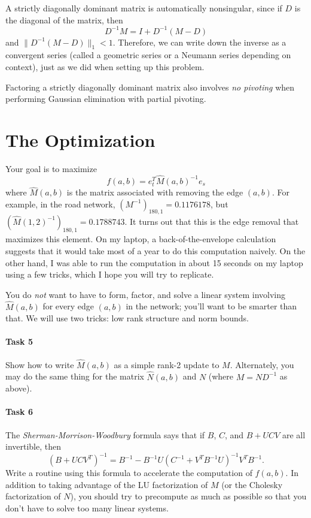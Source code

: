 \documentclass[12pt, leqno]{article}
\begin{document}
A strictly diagonally dominant matrix is automatically nonsingular,
since if $D$ is the diagonal of the matrix, then
\[
  D^{-1} M = I + D^{-1} (M-D)
\]
and $\|D^{-1} (M-D)\|_1 < 1$.  Therefore, we can write down the
inverse as a convergent series (called a geometric series or a Neumann
series depending on context), just as we did when setting up this
problem.

Factoring a strictly diagonally dominant matrix also involves
{\em no pivoting} when performing Gaussian elimination with partial
pivoting.

\section*{The Optimization}

Your goal is to maximize
\[
  f(a,b) = e_t^T \hat{M}(a,b)^{-1} e_s
\]
where $\hat{M}(a,b)$ is the matrix associated with removing the edge
$(a,b)$.  For example, in the road network,
$(M^{-1})_{180,1} = 0.1176178$, but
$(\hat{M}(1,2)^{-1})_{180,1} = 0.1788743$.  It turns out that this is
the edge removal that maximizes this element.  On my laptop,
a back-of-the-envelope calculation suggests that it would take most
of a year to do this computation naively.  On the other hand,
I was able to run the computation in about 15 seconds on my laptop
using a few tricks, which I hope you will try to replicate.

You do {\em not} want to have to form, factor, and solve
a linear system involving $\hat{M}(a,b)$ for every edge $(a,b)$ in
the network; you'll want to be smarter than that.  We will use
two tricks: low rank structure and norm bounds.

\paragraph*{Task 5}
Show how to write $\hat{M}(a,b)$ as a simple rank-2 update to $M$.
Alternately, you may do the same thing for the matrix $\hat{N}(a,b)$
and $N$ (where $M = ND^{-1}$ as above).

\paragraph*{Task 6}
The {\em Sherman-Morrison-Woodbury} formula says that if $B$, $C$, and
$B+UCV$ are all invertible, then
\[
  (B + UCV^T)^{-1} = B^{-1} - B^{-1} U (C^{-1} + V^T B^{-1} U)^{-1} V^T B^{-1}.
\]
Write a routine using this formula
to accelerate the computation of $f(a,b)$.  In addition to taking
advantage of the LU factorization of $M$ (or the Cholesky
factorization of $N$), you should try to precompute as much as
possible so that you don't have to solve too many linear systems.
\end{document}

